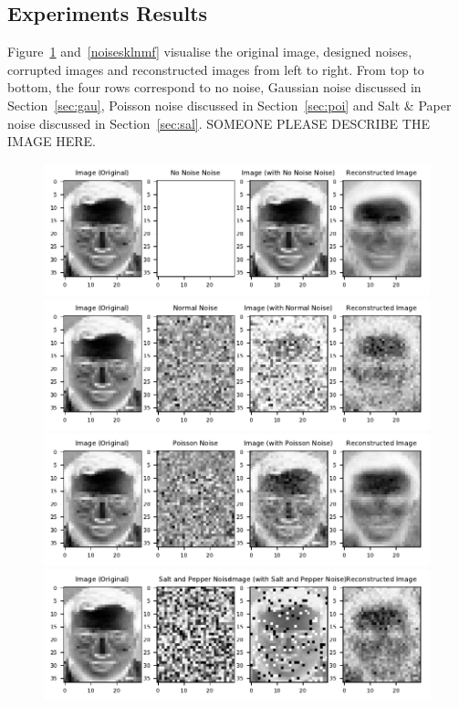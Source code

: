 \subsection{Experiments Results}
Figure~\ref{noisesnmf} and~\ref{noisesklnmf} visualise the original image, designed noises, corrupted images and reconstructed images from left to right. From top to bottom, the four rows correspond to no noise, Gaussian noise discussed in Section~\ref{sec:gau}, Poisson noise discussed in Section~\ref{sec:poi} and Salt \& Paper noise discussed in Section~\ref{sec:sal}. {\color{blue} SOMEONE PLEASE DESCRIBE THE IMAGE HERE.}
\begin{figure}\label{noisesnmf}
	\centering
	\includegraphics[scale=.9]{Result_Multiplication_Euclidean_No_Noise_Comparison}\\
	\includegraphics[scale=.9]{Result_Multiplication_Euclidean_Normal_Comparison}\\
	\includegraphics[scale=.9]{Result_Multiplication_Euclidean_Poisson_Comparison}\\
	\includegraphics[scale=.9]{Result_Multiplication_Euclidean_Salt_and_Pepper_Comparison}

\end{figure}
